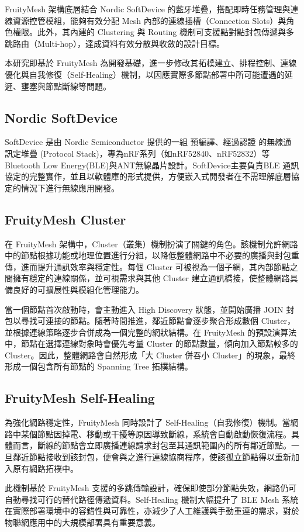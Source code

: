 \begin{ZhChapter}
FruityMesh 架構底層結合 Nordic SoftDevice 的藍牙堆疊，搭配即時任務管理與連線資源控管模組，能夠有效分配 Mesh 內部的連線插槽（Connection Slots）與角色權限。此外，其內建的 Clustering 與 Routing 機制可支援點對點封包傳遞與多跳路由（Multi-hop），達成資料有效分散與收斂的設計目標。

本研究即基於 FruityMesh 為開發基礎，進一步修改其拓樸建立、排程控制、連線優化與自我修復（Self-Healing）機制，以因應實際多節點部署中所可能遭遇的延遲、壅塞與節點斷線等問題。

\subsection{Nordic SoftDevice}
SoftDevice 是由 Nordic Semiconductor \cite{nordic2023softdevices} 提供的一組 預編譯、經過認證 的無線通訊定堆疊 (Protocol Stack)，專為nRF系列（如nRF52840、nRF52832）等Bluetooth Low Energy(BLE)與ANT無線晶片設計。SoftDevice主要負責BLE 通訊協定的完整實作，並且以軟體庫的形式提供，方便嵌入式開發者在不需理解底層協定的情況下進行無線應用開發。

\subsection{FruityMesh Cluster}
在 FruityMesh \cite{fruitymesh2023} 架構中，Cluster（叢集）機制扮演了關鍵的角色。該機制允許網路中的節點根據功能或地理位置進行分組，以降低整體網路中不必要的廣播與封包重傳，進而提升通訊效率與穩定性。每個 Cluster 可被視為一個子網，其內部節點之間擁有穩定的連線關係，並可視需求與其他 Cluster 建立通訊橋接，使整體網路具備良好的可擴展性與模組化管理能力。

當一個節點首次啟動時，會主動進入 High Discovery 狀態，並開始廣播 JOIN 封包以尋找可連接的節點。隨著時間推進，鄰近節點會逐步聚合形成數個 Cluster，並根據連線策略逐步合併成為一個完整的網狀結構。在 FruityMesh 的預設演算法中，節點在選擇連線對象時會優先考量 Cluster 的節點數量，傾向加入節點較多的 Cluster。因此，整體網路會自然形成「大 Cluster 併吞小 Cluster」的現象，最終形成一個包含所有節點的 Spanning Tree 拓樸結構。

\subsection{FruityMesh Self-Healing}
為強化網路穩定性，FruityMesh \cite{fruitymesh2023} 同時設計了 Self-Healing（自我修復）機制。當網路中某個節點因掉電、移動或干擾等原因導致斷線，系統會自動啟動恢復流程。具體而言，斷線的節點會立即廣播連線請求封包至其通訊範圍內的所有鄰近節點。一旦鄰近節點接收到該封包，便會與之進行連線協商程序，使該孤立節點得以重新加入原有網路拓樸中。

此機制基於 FruityMesh 支援的多跳傳輸設計，確保即使部分節點失效，網路仍可自動尋找可行的替代路徑傳遞資料。Self-Healing 機制大幅提升了 BLE Mesh 系統在實際部署環境中的容錯性與可靠性，亦減少了人工維護與手動重連的需求，對於物聯網應用中的大規模部署具有重要意義。

\end{ZhChapter}